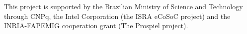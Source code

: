 This project is supported by the
Brazilian Ministry of Science and Technology through CNPq,
the Intel Corporation (the ISRA eCoSoC project) and the INRIA-FAPEMIG
cooperation grant (The Prospiel project).
